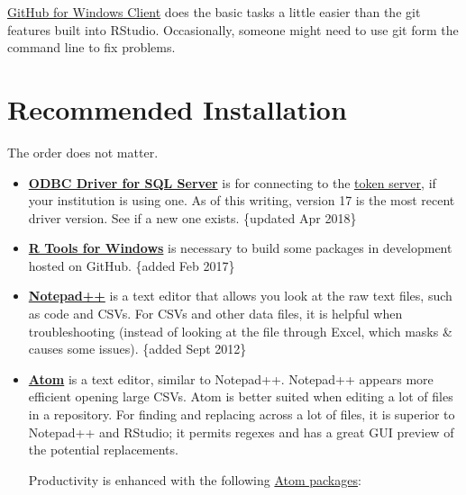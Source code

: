 \documentclass[
]{book}
\begin{document}
\href{http://windows.github.com/}{GitHub for Windows Client} does the basic tasks a little easier than the git features built into RStudio. Occasionally, someone might need to use git form the command line to fix problems.

\hypertarget{installation-recommended}{%
\section{Recommended Installation}\label{installation-recommended}}

The order does not matter.

\begin{itemize}
\item
  \textbf{\href{https://docs.microsoft.com/en-us/sql/connect/odbc/download-odbc-driver-for-sql-server}{ODBC Driver for SQL Server}} is for connecting to the \href{https://github.com/OuhscBbmc/REDCapR/blob/master/vignettes/SecurityDatabase.Rmd}{token server}, if your institution is using one. As of this writing, version 17 is the most recent driver version. See if a new one exists. \{updated Apr 2018\}
\item
  \textbf{\href{https://cran.r-project.org/bin/windows/Rtools/}{R Tools for Windows}} is necessary to build some packages in development hosted on GitHub. \{added Feb 2017\}
\item
  \textbf{\href{http://notepad-plus-plus.org/}{Notepad++}} is a text editor that allows you look at the raw text files, such as code and CSVs. For CSVs and other data files, it is helpful when troubleshooting (instead of looking at the file through Excel, which masks \& causes some issues). \{added Sept 2012\}
\item
  \textbf{\href{https://atom.io/}{Atom}} is a text editor, similar to Notepad++. Notepad++ appears more efficient opening large CSVs. Atom is better suited when editing a lot of files in a repository. For finding and replacing across a lot of files, it is superior to Notepad++ and RStudio; it permits regexes and has a great GUI preview of the potential replacements.

  Productivity is enhanced with the following \href{https://atom.io/packages}{Atom packages}:


\end{itemize}
\end{document}
